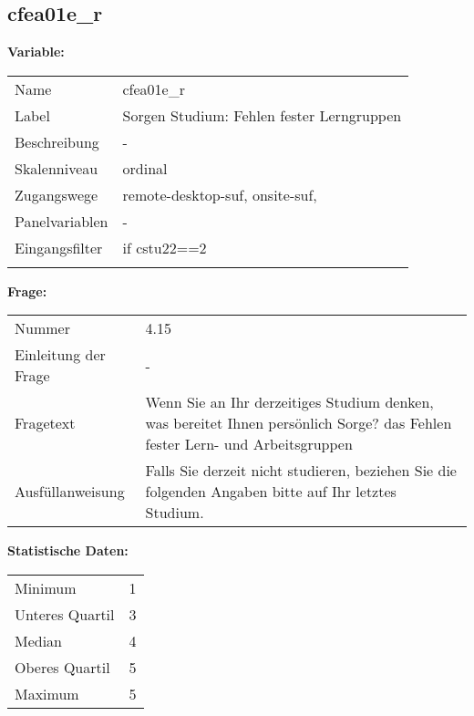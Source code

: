	
	
	\subsection{cfea01e\_r}
	\label{subSection:cfea01e_r}

	\noindent\textbf{Variable:}\\
		\begin{tabular}{lL{11.3cm}}
			\label{tableVariable:cfea01e_r}
			Name & cfea01e\_r \\
			Label & Sorgen Studium: Fehlen fester Lerngruppen \\
			Beschreibung & - \\
			Skalenniveau & ordinal \\
			Zugangswege &
				remote-desktop-suf,
				onsite-suf,
 \\
			Panelvariablen & -
			 \\
			Eingangsfilter & if cstu22==2 \\
 \\
		\end{tabular}

		\vspace*{1 cm}
		\noindent\textbf{Frage:}\\
		\begin{tabular}{lL{11.3cm}}
			\label{tableQuestion:cfea01e_r}
			Nummer & 4.15 \\
			Einleitung der Frage & - \\
			Fragetext & Wenn Sie an Ihr derzeitiges Studium denken, was bereitet Ihnen persönlich Sorge?
das Fehlen fester Lern- und Arbeitsgruppen \\
			Ausfüllanweisung & Falls Sie derzeit nicht studieren, beziehen Sie die folgenden Angaben bitte auf Ihr letztes Studium. \\
		\end{tabular}


		\vspace*{1 cm}
		\noindent\textbf{Statistische Daten:}\\
			\begin{tabular}{ll}
				\label{tableStatistics:cfea01e_r}
					Minimum & 1 \\
					Unteres Quartil & 3 \\
					Median & 4 \\
					Oberes Quartil & 5 \\
					Maximum & 5 \\
			\end{tabular}




